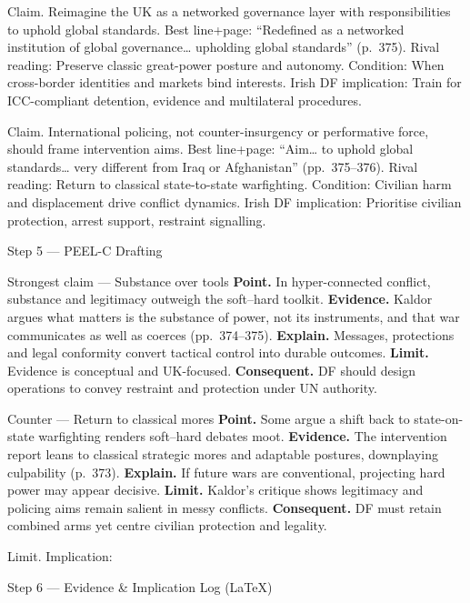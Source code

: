 Claim. Reimagine the UK as a networked governance layer with responsibilities to uphold global standards.
Best line+page: “Redefined as a networked institution of global governance… upholding global standards” (p.~375).
Rival reading: Preserve classic great-power posture and autonomy.
Condition: When cross-border identities and markets bind interests.
Irish DF implication: Train for ICC-compliant detention, evidence and multilateral procedures.

Claim. International policing, not counter-insurgency or performative force, should frame intervention aims.
Best line+page: “Aim… to uphold global standards… very different from Iraq or Afghanistan” (pp.~375–376).
Rival reading: Return to classical state-to-state warfighting.
Condition: Civilian harm and displacement drive conflict dynamics.
Irish DF implication: Prioritise civilian protection, arrest support, restraint signalling.

Step 5 — PEEL-C Drafting

Strongest claim — Substance over tools
\textbf{Point.} In hyper-connected conflict, substance and legitimacy outweigh the soft–hard toolkit.
\textbf{Evidence.} Kaldor argues what matters is the substance of power, not its instruments, and that war communicates as well as coerces (pp.~374–375).
\textbf{Explain.} Messages, protections and legal conformity convert tactical control into durable outcomes.
\textbf{Limit.} Evidence is conceptual and UK-focused.
\textbf{Consequent.} DF should design operations to convey restraint and protection under UN authority.

Counter — Return to classical mores
\textbf{Point.} Some argue a shift back to state-on-state warfighting renders soft–hard debates moot.
\textbf{Evidence.} The intervention report leans to classical strategic mores and adaptable postures, downplaying culpability (p.~373).
\textbf{Explain.} If future wars are conventional, projecting hard power may appear decisive.
\textbf{Limit.} Kaldor’s critique shows legitimacy and policing aims remain salient in messy conflicts.
\textbf{Consequent.} DF must retain combined arms yet centre civilian protection and legality.

Limit. Implication:

Step 6 — Evidence & Implication Log (LaTeX)


